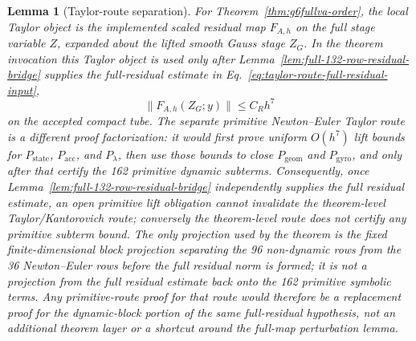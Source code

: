 \documentclass[preprint,12pt]{elsarticle}
\newtheorem{lemma}{Lemma}
\begin{document}
\begin{lemma}[Taylor-route separation]
\label{lem:taylor-route-separation}
For Theorem~\ref{thm:g6fullva-order}, the local Taylor object is the
implemented scaled residual map \(F_{A,h}\) on the full stage variable
\(Z\), expanded about the lifted smooth Gauss stage \(Z_G\).  In the theorem
invocation this Taylor object is used only after
Lemma~\ref{lem:full-132-row-residual-bridge} supplies the full-residual
estimate in Eq.~\eqref{eq:taylor-route-full-residual-input},
\begin{equation}
\label{eq:taylor-route-full-residual-input}
  \|F_{A,h}(Z_G;y)\|\le C_Rh^7
\end{equation}
on the accepted compact tube.  The separate primitive Newton--Euler Taylor
route is a different proof factorization: it would first prove uniform
\(O(h^7)\) lift bounds for \(P_{\mathrm{state}}\), \(P_{\mathrm{acc}}\), and
\(P_{\lambda}\), then use those bounds to close \(P_{\mathrm{geom}}\) and
\(P_{\mathrm{gyro}}\), and only after that certify the 162 primitive dynamic
subterms.  Consequently, once
Lemma~\ref{lem:full-132-row-residual-bridge} independently supplies the full
residual estimate, an open primitive lift obligation cannot invalidate the
theorem-level Taylor/Kantorovich route; conversely the theorem-level route
does not certify any primitive subterm bound.  The only projection used by
the theorem is the fixed finite-dimensional block projection separating the
96 non-dynamic rows from the 36 Newton--Euler rows before the full residual
norm is formed; it is not a projection from the full residual estimate back
onto the 162 primitive symbolic terms.
Any primitive-route proof for that route would therefore be a replacement proof
for the dynamic-block portion of the same full-residual
hypothesis, not an additional theorem layer or a shortcut around the full-map
perturbation lemma.
\end{lemma}
\end{document}
